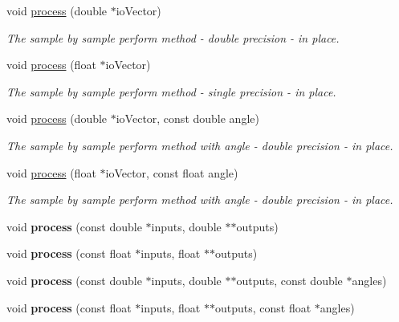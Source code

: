 \begin{DoxyCompactItemize}
void \hyperlink{class_ambisonic_encoder_a7e5cfedb354f5ad134aa19a76a1f61e6}{process} (double $\ast$io\-Vector)
\begin{DoxyCompactList}\small\item\em The sample by sample perform method -\/ double precision -\/ in place. \end{DoxyCompactList}\item 
void \hyperlink{class_ambisonic_encoder_ac8db5ffd1663fd64d8f8e9c701854088}{process} (float $\ast$io\-Vector)
\begin{DoxyCompactList}\small\item\em The sample by sample perform method -\/ single precision -\/ in place. \end{DoxyCompactList}\item 
void \hyperlink{class_ambisonic_encoder_ac68ce0e05589431e54efd91384787e79}{process} (double $\ast$io\-Vector, const double angle)
\begin{DoxyCompactList}\small\item\em The sample by sample perform method with angle -\/ double precision -\/ in place. \end{DoxyCompactList}\item 
void \hyperlink{class_ambisonic_encoder_ab77e6db3e31015c42a066f0f3a6e9a53}{process} (float $\ast$io\-Vector, const float angle)
\begin{DoxyCompactList}\small\item\em The sample by sample perform method with angle -\/ double precision -\/ in place. \end{DoxyCompactList}\item 
\hypertarget{class_ambisonic_encoder_a3f6b05a3aa600963f8eed95870160ab7}{void {\bfseries process} (const double $\ast$inputs, double $\ast$$\ast$outputs)}\label{class_ambisonic_encoder_a3f6b05a3aa600963f8eed95870160ab7}

\item 
\hypertarget{class_ambisonic_encoder_a34257ee8330812c3b91dca91298a3133}{void {\bfseries process} (const float $\ast$inputs, float $\ast$$\ast$outputs)}\label{class_ambisonic_encoder_a34257ee8330812c3b91dca91298a3133}

\item 
\hypertarget{class_ambisonic_encoder_a2e16bcb5691713de370c8dc1e2327ac7}{void {\bfseries process} (const double $\ast$inputs, double $\ast$$\ast$outputs, const double $\ast$angles)}\label{class_ambisonic_encoder_a2e16bcb5691713de370c8dc1e2327ac7}

\item 
\hypertarget{class_ambisonic_encoder_aa5375868a55396a7f9a5110b84e85a06}{void {\bfseries process} (const float $\ast$inputs, float $\ast$$\ast$outputs, const float $\ast$angles)}\label{class_ambisonic_encoder_aa5375868a55396a7f9a5110b84e85a06}


\end{DoxyCompactItemize}
